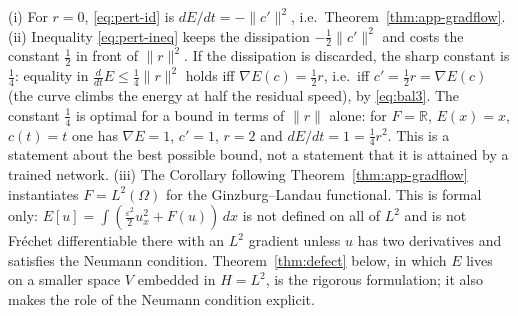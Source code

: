 \begin{Remark}\label{rem:sharp}
(i) For $r=0$, \eqref{eq:pert-id} is $dE/dt=-\|c'\|^2$, i.e.\ Theorem~\ref{thm:app-gradflow}.
(ii) Inequality \eqref{eq:pert-ineq} keeps the dissipation $-\tfrac12\|c'\|^2$ and costs the constant $\tfrac12$ in front of $\|r\|^2$.
If the dissipation is discarded, the sharp constant is $\tfrac14$: equality in $\frac{d}{dt}E\le\frac14\|r\|^2$ holds iff $\nabla E(c)=\tfrac12 r$, i.e.\ iff $c'=\tfrac12 r=\nabla E(c)$ (the curve climbs the energy at half the residual speed), by \eqref{eq:bal3}.
The constant $\tfrac14$ is optimal for a bound in terms of $\|r\|$ alone: for $F=\mathbb{R}$, $E(x)=x$, $c(t)=t$ one has $\nabla E=1$, $c'=1$, $r=2$ and $dE/dt=1=\tfrac14r^2$.
This is a statement about the best possible bound, not a statement that it is attained by a trained network.
(iii) The Corollary following Theorem~\ref{thm:app-gradflow} instantiates $F=L^2(\Omega)$ for the Ginzburg--Landau functional.
This is formal only: $E[u]=\int(\frac{\varepsilon^2}{2}u_x^2+F(u))\,dx$ is not defined on all of $L^2$ and is not Fr\'echet differentiable there with an $L^2$ gradient unless $u$ has two derivatives and satisfies the Neumann condition.
Theorem~\ref{thm:defect} below, in which $E$ lives on a smaller space $V$ embedded in $H=L^2$, is the rigorous formulation; it also makes the role of the Neumann condition explicit.
\end{Remark}

